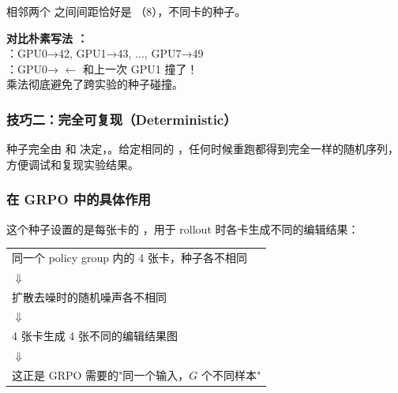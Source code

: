 相邻两个  之间间距恰好是 （8），不同卡的种子。

\begin{warnbox}
\textbf{对比朴素写法 ：}\\
：GPU0→42, GPU1→43, ..., GPU7→49\\
：GPU0→ \quad $\leftarrow$ 和上一次 GPU1 撞了！\\
乘法彻底避免了跨实验的种子碰撞。
\end{warnbox}

\subsubsection{技巧二：完全可复现（Deterministic）}

种子完全由  和  决定，。给定相同的 ，任何时候重跑都得到完全一样的随机序列，方便调试和复现实验结果。

\subsubsection{在 GRPO 中的具体作用}

这个种子设置的是每张卡的 ，用于 rollout 时各卡生成不同的编辑结果：

\begin{center}
\begin{tabular}{p{13cm}}
\hline
同一个 policy group 内的 4 张卡，种子各不相同\\
$\Downarrow$\\
扩散去噪时的随机噪声各不相同\\
$\Downarrow$\\
4 张卡生成 4 张不同的编辑结果图\\
$\Downarrow$\\
这正是 GRPO 需要的"同一个输入，$G$ 个不同样本"\\
\hline
\end{tabular}
\end{center}

